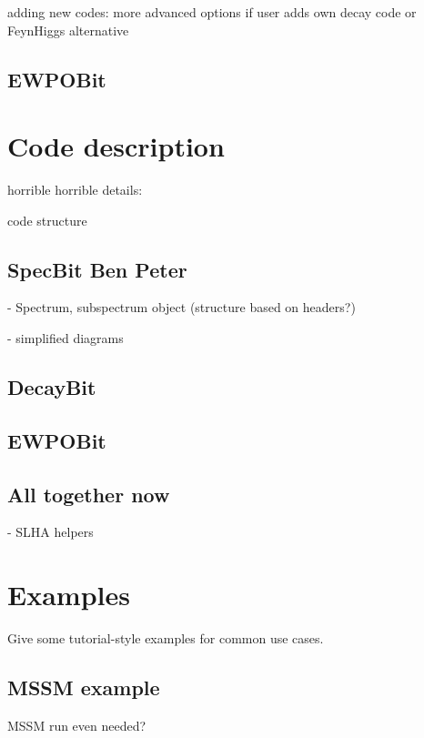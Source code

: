 \documentclass[11pt,a4paper]{article}
\newcommand{\Ben}[1]{{\bf\color{magenta}Ben #1}}
\newcommand{\Peter}[1]{{\bf\color{green}Peter #1}}
\begin{document}
adding new codes: more advanced options if user adds own decay code or FeynHiggs alternative

\subsection{EWPOBit}



\section{Code description}

horrible horrible details:

code structure

\subsection{SpecBit \Ben{} \Peter{}}

- Spectrum, subspectrum object (structure based on headers?)

- simplified diagrams 

\subsection{DecayBit}


\subsection{EWPOBit}

\subsection{All together now}

- SLHA helpers



\section{Examples}
Give some tutorial-style examples for common use cases.

\subsection{MSSM example}
MSSM run even needed?
\end{document}
